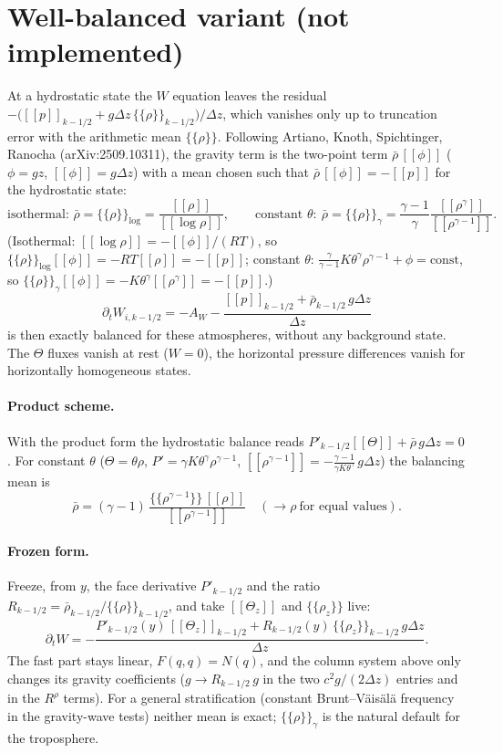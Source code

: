 \documentclass[11pt,a4paper]{article}
\newcommand{\avg}[1]{\{\!\{#1\}\!\}}
\newcommand{\jump}[1]{[\![#1]\!]}
\begin{document}
\section{Well-balanced variant (not implemented)}\label{sec:wb}
At a hydrostatic state the $W$ equation leaves the residual
$-\big(\jump p_{k-1/2}+g\Delta z\,\avg\rho_{k-1/2}\big)/\Delta z$, which vanishes only up to truncation
error with the arithmetic mean $\avg\rho$. Following Artiano, Knoth, Spichtinger, Ranocha (arXiv:2509.10311),
the gravity term is the two-point term $\bar\rho\,\jump\phi$ ($\phi=gz$, $\jump\phi=g\Delta z$) with a mean chosen
such that $\bar\rho\,\jump\phi=-\jump p$ for the hydrostatic state:
\[
\text{isothermal: }\bar\rho=\avg\rho_{\log}=\frac{\jump\rho}{\jump{\log\rho}},\qquad
\text{constant }\theta:\ \bar\rho=\avg\rho_\gamma=\frac{\gamma-1}{\gamma}\frac{\jump{\rho^\gamma}}{\jump{\rho^{\gamma-1}}}.
\]
(Isothermal: $\jump{\log\rho}=-\jump\phi/(RT)$, so $\avg\rho_{\log}\jump\phi=-RT\jump\rho=-\jump p$; constant $\theta$:
$\tfrac{\gamma}{\gamma-1}K\theta^\gamma\rho^{\gamma-1}+\phi=\mathrm{const}$, so $\avg\rho_\gamma\jump\phi=-K\theta^\gamma\jump{\rho^\gamma}=-\jump p$.)
\[
\partial_tW_{i,k-1/2}=-A_W-\frac{\jump p_{k-1/2}+\bar\rho_{k-1/2}\,g\Delta z}{\Delta z}
\]
is then exactly balanced for these atmospheres, without any background state. The $\Theta$ fluxes vanish at
rest ($W=0$), the horizontal pressure differences vanish for horizontally homogeneous states.

\paragraph{Product scheme.} With the product form the hydrostatic balance reads
$P'_{k-1/2}\jump\Theta+\bar\rho\,g\Delta z=0$. For constant $\theta$ ($\Theta=\theta\rho$, $P'=\gamma K\theta^\gamma\rho^{\gamma-1}$,
$\jump{\rho^{\gamma-1}}=-\tfrac{\gamma-1}{\gamma K\theta^\gamma}\,g\Delta z$) the balancing mean is
\[
\bar\rho=(\gamma-1)\,\frac{\avg{\rho^{\gamma-1}}\,\jump\rho}{\jump{\rho^{\gamma-1}}}\quad(\to\rho\ \text{for equal values}).
\]
\paragraph{Frozen form.} Freeze, from $y$, the face derivative $P'_{k-1/2}$ and the ratio
$R_{k-1/2}=\bar\rho_{k-1/2}/\avg\rho_{k-1/2}$, and take $\jump{\Theta_z}$ and $\avg{\rho_z}$ live:
\[
\partial_tW=-\frac{P'_{k-1/2}(y)\,\jump{\Theta_z}_{k-1/2}+R_{k-1/2}(y)\,\avg{\rho_z}_{k-1/2}\,g\Delta z}{\Delta z}.
\]
The fast part stays linear, $F(q,q)=N(q)$, and the column system above only changes its gravity coefficients
($g\to R_{k-1/2}\,g$ in the two $c^2g/(2\Delta z)$ entries and in the $R^\rho$ terms). For a general stratification
(constant Brunt--V\"ais\"al\"a frequency in the gravity-wave tests) neither mean is exact; $\avg\rho_\gamma$ is the
natural default for the troposphere.
\end{document}
